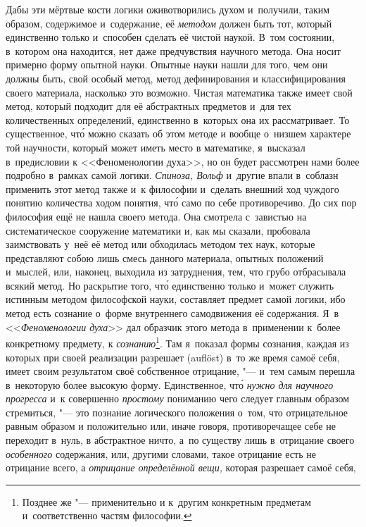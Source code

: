 Дабы эти мёртвые кости логики оживотворились духом и~получили, таким
образом, содержимое и~содержание, её {\em методом}
должен быть тот, который единственно только и~способен сделать её чистой
наукой. В~том состоянии, в~котором она находится, нет даже предчувствия
научного метода. Она носит примерно форму опытной науки. Опытные науки
нашли для того, чем они должны быть, свой особый метод, метод дефинирования
и классифицирования своего материала, насколько это возможно. Чистая
математика также имеет свой метод, который подходит для её абстрактных
предметов и~для тех количественных определений, единственно в~которых она
их рассматривает. То существенное, чт\'{о} можно сказать об этом методе и
вообще о~низшем характере той научности, который может иметь место в
математике, я~высказал в~предисловии к <<Феноменологии духа>>, но он будет
рассмотрен нами более подробно в~рамках самой логики.
{\em Спиноза, Вольф} и~другие
впали в~соблазн применить этот метод также и~к философии и~сделать внешний
ход чуждого понятию количества ходом понятия, чт\'{о} само по себе
противоречиво. До сих пор философия ещё не нашла своего метода. Она
смотрела с~завистью на систематическое сооружение математики и, как мы
сказали, пробовала заимствовать у~неё её метод или обходилась методом тех
наук, которые представляют собою лишь смесь данного материала, опытных
положений и~мыслей, или, наконец, выходила из затруднения, тем, что грубо
отбрасывала всякий метод. Но раскрытие того, чт\'{о} единственно только и~может
служить истинным методом философской науки, составляет предмет самой
логики, ибо метод есть сознание о~форме внутреннего самодвижения её
содержания. Я~в <<{\em Феноменологии духа}>> дал образчик
этого метода в~применении к~более конкретному предмету, к
{\em сознанию}\footnote{Позднее же "--- применительно
и к~другим конкретным предметам и~соответственно частям философии.}.
Там я~показал формы сознания, каждая из которых при своей реализации разрешает
(auf\-löst) в~то же время самоё себя, имеет своим результатом своё собственное
отрицание, "--- и~тем самым перешла в~некоторую более высокую форму.
Единственное, чт\'{о} {\em нужно для научного прогресса} и~к совершенно
{\em простому} пониманию чего следует главным образом стремиться, "--- это
познание логического положения о~том, что отрицательное равным образом и
положительно или, иначе говоря, противоречащее себе не переходит в~нуль,
в абстрактное ничто, а~по существу лишь в~отрицание своего {\em особенного}
содержания, или, другими словами, такое отрицание есть не отрицание всего,
а {\em отрицание определённой вещи,} которая разрешает самоё себя,
